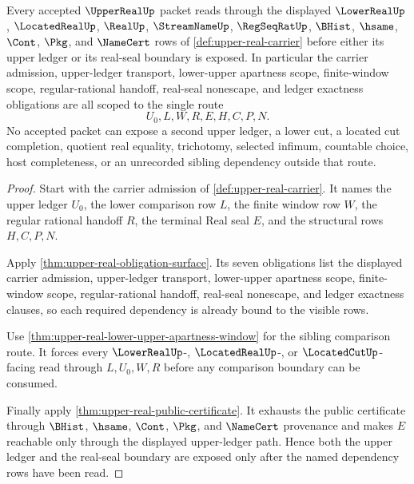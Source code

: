 \begin{theorem}
\label{thm:upperreal-scoped-kernel-dependency-route}
Every accepted $\UpperRealUp$ packet reads through the displayed $\LowerRealUp$, $\LocatedRealUp$, $\RealUp$, $\StreamNameUp$, $\RegSeqRatUp$, $\BHist$, $\hsame$, $\Cont$, $\Pkg$, and $\NameCert$ rows of \autoref{def:upper-real-carrier} before either its upper ledger or its real-seal boundary is exposed. In particular the carrier admission, upper-ledger transport, lower-upper apartness scope, finite-window scope, regular-rational handoff, real-seal nonescape, and ledger exactness obligations are all scoped to the single route
$$
U_0,L,W,R,E,H,C,P,N .
$$
No accepted packet can expose a second upper ledger, a lower cut, a located cut completion, quotient real equality, trichotomy, selected infimum, countable choice, host completeness, or an unrecorded sibling dependency outside that route.
\end{theorem}
\begin{proof}
Start with the carrier admission of \autoref{def:upper-real-carrier}. It names the upper ledger $U_0$, the lower comparison row $L$, the finite window row $W$, the regular rational handoff $R$, the terminal Real seal $E$, and the structural rows $H,C,P,N$.

Apply \autoref{thm:upper-real-obligation-surface}. Its seven obligations list the displayed carrier admission, upper-ledger transport, lower-upper apartness scope, finite-window scope, regular-rational handoff, real-seal nonescape, and ledger exactness clauses, so each required dependency is already bound to the visible rows.

Use \autoref{thm:upper-real-lower-upper-apartness-window} for the sibling comparison route. It forces every $\LowerRealUp$-, $\LocatedRealUp$-, or $\LocatedCutUp$-facing read through $L,U_0,W,R$ before any comparison boundary can be consumed.

Finally apply \autoref{thm:upper-real-public-certificate}. It exhausts the public certificate through $\BHist$, $\hsame$, $\Cont$, $\Pkg$, and $\NameCert$ provenance and makes $E$ reachable only through the displayed upper-ledger path. Hence both the upper ledger and the real-seal boundary are exposed only after the named dependency rows have been read.
\end{proof}

